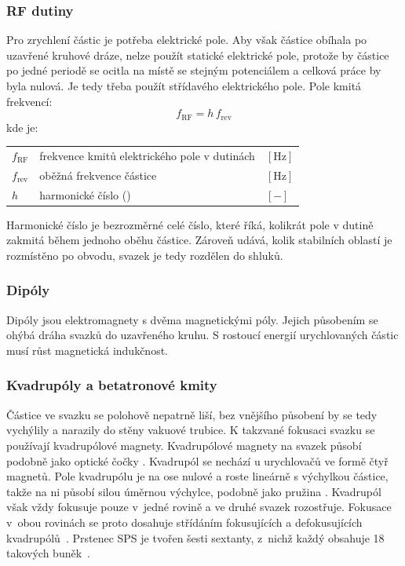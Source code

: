 \subsubsection{RF dutiny}
Pro zrychlení částic je potřeba elektrické pole. Aby však částice obíhala po uzavřené kruhové dráze, nelze použít statické elektrické pole, protože by částice po jedné periodě se ocitla na místě se stejným potenciálem a celková práce by byla nulová. Je tedy třeba použít střídavého elektrického pole. Pole kmitá frekvencí:
\begin{equation}
	f_\text{RF} = h\,f_\text{rev}
\end{equation}
\vspace{0.5em}
\noindent kde je: \\
\begin{tabular}{l l l}
	$f_\text{RF}$ & frekvence kmitů elektrického pole v dutinách & $[\text{Hz}]$ \\
	$f_\text{rev}$ & oběžná frekvence částice & $[\text{Hz}]$ \\
	$h$ & harmonické číslo () & $[-]$ \\
\end{tabular}

Harmonické číslo je bezrozměrné celé číslo, které říká, kolikrát pole v dutině zakmitá během jednoho oběhu částice. Zároveň udává, kolik stabilních oblastí je rozmístěno po obvodu, svazek je tedy rozdělen do shluků.



\subsubsection{Dipóly}
Dipóly jsou elektromagnety s dvěma magnetickými póly. Jejich působením se ohýbá dráha svazků do uzavřeného kruhu. S rostoucí energií urychlovaných částic musí růst magnetická indukčnost. \cite{Tecker2020} 

\subsubsection{Kvadrupóly a betatronové kmity}
Částice ve svazku se polohově nepatrně liší, bez vnějšího působení by se tedy vychýlily a narazily do stěny vakuové trubice. K takzvané fokusaci svazku se používají kvadrupólové magnety. Kvadrupólové magnety na svazek působí podobně jako optické čočky \cite{cern_how_accelerator_works}. Kvadrupól se nechází u urychlovačů ve formě čtyř magnetů. Pole kvadrupólu je na ose nulové a roste lineárně s výchylkou částice, takže na ni působí silou úměrnou výchylce, podobně jako
pružina \cite{Holzer2018}. Kvadrupól však vždy fokusuje pouze v~jedné rovině a ve druhé svazek rozostřuje. Fokusace v~obou rovinách se
proto dosahuje střídáním fokusujících a defokusujících
kvadrupólů~\cite{Holzer2018}. Prstenec SPS je tvořen šesti
sextanty, z~nichž každý obsahuje 18 takových
buněk~\cite[kap.~IV.A]{Etisken2023}.

